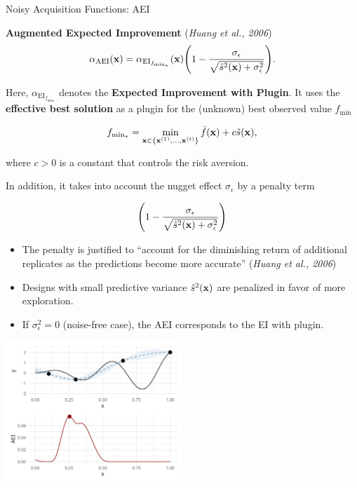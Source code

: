 \documentclass[11pt,compress,t,notes=noshow, xcolor=table]{beamer}
\begin{document}
\begin{vbframe}{Noisy Acquisition Functions: AEI}


\textbf{Augmented Expected Improvement} (\emph{Huang et al., 2006})
$$
  \alpha_{\text{AEI}}(\mathbf{x}) = \alpha_{\text{EI}_{f_{\min_*}}}(\mathbf{x}) \Bigg(1- \frac{\sigma_\epsilon}{\sqrt{\hat{s}^2(\mathbf{x})+ \sigma_\epsilon^2}}\Bigg).
$$

Here, $\alpha_{\text{EI}_{f_{\min_*}}}$ denotes the \textbf{Expected Improvement with Plugin}.
It uses the \textbf{effective best solution} as a plugin for the (unknown) best observed value $f_{\min}$

$$
  f_{\min_*} = \min_{\mathbf{x} \in \{\mathbf{x}^{(1)}, ..., \mathbf{x}^{(t)}\}}  \hat{f}(\mathbf{x}) + c \hat{s}(\mathbf{x}),
$$

where $c > 0$ is a constant that controls the risk aversion.


\framebreak

In addition, it takes into account the nugget effect $\sigma_\epsilon$ by a penalty term

$$
  \Bigg(1- \frac{\sigma_\epsilon}{\sqrt{\hat{s}^2(\mathbf{x})+ \sigma_\epsilon^2}}\Bigg)
$$

\begin{itemize}
  \item The penalty is justified to \enquote{account for the diminishing return of additional replicates as the predictions become more accurate} (\emph{Huang et al., 2006})
  \item Designs with small predictive variance $\hat{s}^2(\mathbf{x})$ are penalized in favor of more exploration.
  \item If $\sigma_\epsilon^2 = 0$ (noise-free case), the AEI corresponds to the EI with plugin. 
\end{itemize}

\framebreak

\vspace*{1cm}

\begin{center}
  \includegraphics[width = 0.5\textwidth]{figure_man/noisy_3.png}
\end{center}


\end{vbframe}
\end{document}
